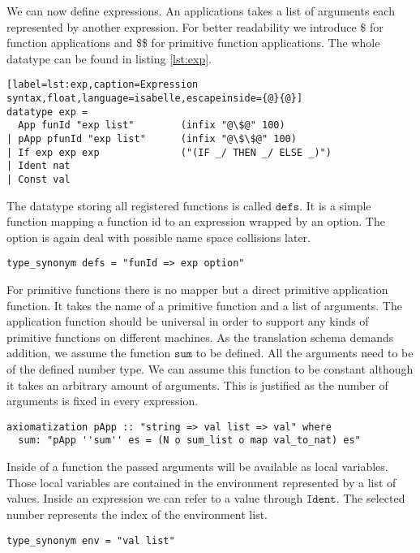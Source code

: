 We can now define expressions.
An applications takes a list of arguments each represented by another expression.
For better readability we introduce \$ for function applications and \$\$ for primitive function applications.
The whole datatype can be found in listing \ref{lst:exp}.
\begin{lstlisting}[label=lst:exp,caption=Expression syntax,float,language=isabelle,escapeinside={@}{@}]
datatype exp =
  App funId "exp list"        (infix "@\$@" 100)
| pApp pfunId "exp list"      (infix "@\$\$@" 100)
| If exp exp exp              ("(IF _/ THEN _/ ELSE _)")
| Ident nat
| Const val
\end{lstlisting}

The datatype storing all registered functions is called $\texttt{defs}$.
It is a simple function mapping a function id to an expression wrapped by an option.
The option is again deal with possible name space collisions later.
\begin{lstlisting}[mathescape=true,language=isabelle]
type_synonym defs = "funId => exp option"
\end{lstlisting}

For primitive functions there is no mapper but a direct primitive application function.
It takes the name of a primitive function and a list of arguments.
The application function should be universal in order to support any kinds of primitive functions on different machines.
As the translation schema demands addition, we assume the function $\texttt{sum}$ to be defined.
All the arguments need to be of the defined number type.
We can assume this function to be constant although it takes an arbitrary amount of arguments.
This is justified as the number of arguments is fixed in every expression.
\begin{lstlisting}[mathescape=true,language=isabelle]
axiomatization pApp :: "string => val list => val" where
  sum: "pApp ''sum'' es = (N o sum_list o map val_to_nat) es"
\end{lstlisting}

Inside of a function the passed arguments will be available as local variables.
Those local variables are contained in the environment represented by a list of values.
Inside an expression we can refer to a value through $\texttt{Ident}$.
The selected number represents the index of the environment list.
\begin{lstlisting}[language=isabelle]
type_synonym env = "val list"
\end{lstlisting}

